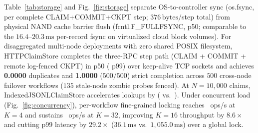 \documentclass[10pt,journal]{IEEEtran}
\def\texttt#1{#1}%
\theoremstyle{definition}
\theoremstyle{remark}
\begin{document}
Table~\ref{tab:storage} and Fig.~\ref{fig:storage} separate OS-to-controller sync (\texttt{os.fsync}, \LatFsyncStepPFifty{} per complete \texttt{CLAIM}+\texttt{COMMIT}+\texttt{CKPT} step; $376\,\mathrm{bytes}$/step total) from physical NAND cache barrier flush (\texttt{fcntl.F\_FULLFSYNC}, \LatFullFsyncStepPFifty{} p50; comparable to the $16.4$--$20.3\,\mathrm{ms}$ per-record \texttt{fsync} on virtualized cloud block volumes). For disaggregated multi-node deployments with zero shared POSIX filesystem, \texttt{HTTPClaimStore} completes the three-RPC step path (\texttt{CLAIM} + \texttt{COMMIT} + remote log-fenced \texttt{CKPT}) in \LatNetStepPFifty{} p50 (\LatNetStepPNN{} p99) over keep-alive TCP sockets and achieves \textbf{0.0000} duplicates and \textbf{1.0000} ($500/500$) strict completion across $500$ cross-node failover workflows ($135$ stale-node zombie probes fenced). At $N = 10{,}000$ claims, \texttt{IndexedJSONLClaimStore} accelerates lookups by \ScaleTenKSpeedup{} (\ScaleTenKCFUs{} vs.\ \ScaleTenKLegacyMs{}). Under concurrent load (Fig.~\ref{fig:concurrency}), per-workflow fine-grained locking reaches \HttpPeakOps{}~ops/s at $K=4$ and sustains \HttpThirtyTwoOps{}~ops/s at $K=32$, improving $K=16$ throughput by $8.6\times$ and cutting p99 latency by $29.2\times$ ($36.1\,\mathrm{ms}$ vs.\ $1{,}055.0\,\mathrm{ms}$) over a global lock.
\end{document}
